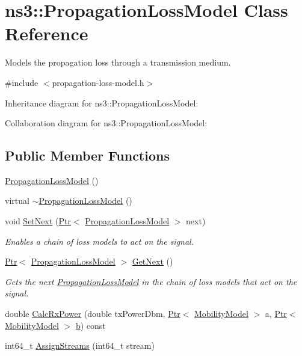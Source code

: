 \hypertarget{classns3_1_1PropagationLossModel}{}\section{ns3\+:\+:Propagation\+Loss\+Model Class Reference}
\label{classns3_1_1PropagationLossModel}


Models the propagation loss through a transmission medium.  




{\ttfamily \#include $<$propagation-\/loss-\/model.\+h$>$}



Inheritance diagram for ns3\+:\+:Propagation\+Loss\+Model\+:


Collaboration diagram for ns3\+:\+:Propagation\+Loss\+Model\+:
\subsection*{Public Member Functions}
\begin{DoxyCompactItemize}
\item 
\hyperlink{classns3_1_1PropagationLossModel_ace8b78c2c8e805cd0a919d7e3543318c}{Propagation\+Loss\+Model} ()
\item 
virtual \hyperlink{classns3_1_1PropagationLossModel_af5b0c60c6b55e1d2eacbef8db20c1551}{$\sim$\+Propagation\+Loss\+Model} ()
\item 
void \hyperlink{classns3_1_1PropagationLossModel_ac6d627f2eb09daa057de080615ac1013}{Set\+Next} (\hyperlink{classns3_1_1Ptr}{Ptr}$<$ \hyperlink{classns3_1_1PropagationLossModel}{Propagation\+Loss\+Model} $>$ next)
\begin{DoxyCompactList}\small\item\em Enables a chain of loss models to act on the signal. \end{DoxyCompactList}\item 
\hyperlink{classns3_1_1Ptr}{Ptr}$<$ \hyperlink{classns3_1_1PropagationLossModel}{Propagation\+Loss\+Model} $>$ \hyperlink{classns3_1_1PropagationLossModel_af6455cef4f66f2ae7e5b77bebb1d57f9}{Get\+Next} ()
\begin{DoxyCompactList}\small\item\em Gets the next \hyperlink{classns3_1_1PropagationLossModel}{Propagation\+Loss\+Model} in the chain of loss models that act on the signal. \end{DoxyCompactList}\item 
double \hyperlink{classns3_1_1PropagationLossModel_a8b42564e9b03e2197f17aab6692c4fee}{Calc\+Rx\+Power} (double tx\+Power\+Dbm, \hyperlink{classns3_1_1Ptr}{Ptr}$<$ \hyperlink{classns3_1_1MobilityModel}{Mobility\+Model} $>$ a, \hyperlink{classns3_1_1Ptr}{Ptr}$<$ \hyperlink{classns3_1_1MobilityModel}{Mobility\+Model} $>$ \hyperlink{lte__pathloss_8m_a21ad0bd836b90d08f4cf640b4c298e7c}{b}) const 
\item 
int64\+\_\+t \hyperlink{classns3_1_1PropagationLossModel_ac5ce9ca219b7405645d160487973c076}{Assign\+Streams} (int64\+\_\+t stream)
\end{DoxyCompactItemize}
